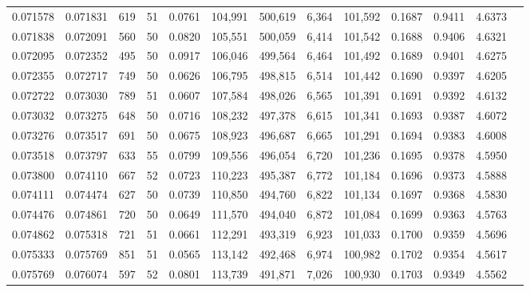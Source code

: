 \begin{tabular}{rrrrrrrrrrrrr}
0.071578 & 0.071831 &   619 &  51 &                                     0.0761 & 104,991 & 500,619 &   6,364 & 101,592 & 0.1687 & 0.9411 & 4.6373 \\
0.071838 & 0.072091 &   560 &  50 &                                     0.0820 & 105,551 & 500,059 &   6,414 & 101,542 & 0.1688 & 0.9406 & 4.6321 \\
0.072095 & 0.072352 &   495 &  50 &                                     0.0917 & 106,046 & 499,564 &   6,464 & 101,492 & 0.1689 & 0.9401 & 4.6275 \\
0.072355 & 0.072717 &   749 &  50 &                                     0.0626 & 106,795 & 498,815 &   6,514 & 101,442 & 0.1690 & 0.9397 & 4.6205 \\
0.072722 & 0.073030 &   789 &  51 &                                     0.0607 & 107,584 & 498,026 &   6,565 & 101,391 & 0.1691 & 0.9392 & 4.6132 \\
0.073032 & 0.073275 &   648 &  50 &                                     0.0716 & 108,232 & 497,378 &   6,615 & 101,341 & 0.1693 & 0.9387 & 4.6072 \\
0.073276 & 0.073517 &   691 &  50 &                                     0.0675 & 108,923 & 496,687 &   6,665 & 101,291 & 0.1694 & 0.9383 & 4.6008 \\
0.073518 & 0.073797 &   633 &  55 &                                     0.0799 & 109,556 & 496,054 &   6,720 & 101,236 & 0.1695 & 0.9378 & 4.5950 \\
0.073800 & 0.074110 &   667 &  52 &                                     0.0723 & 110,223 & 495,387 &   6,772 & 101,184 & 0.1696 & 0.9373 & 4.5888 \\
0.074111 & 0.074474 &   627 &  50 &                                     0.0739 & 110,850 & 494,760 &   6,822 & 101,134 & 0.1697 & 0.9368 & 4.5830 \\
0.074476 & 0.074861 &   720 &  50 &                                     0.0649 & 111,570 & 494,040 &   6,872 & 101,084 & 0.1699 & 0.9363 & 4.5763 \\
0.074862 & 0.075318 &   721 &  51 &                                     0.0661 & 112,291 & 493,319 &   6,923 & 101,033 & 0.1700 & 0.9359 & 4.5696 \\
0.075333 & 0.075769 &   851 &  51 &                                     0.0565 & 113,142 & 492,468 &   6,974 & 100,982 & 0.1702 & 0.9354 & 4.5617 \\
0.075769 & 0.076074 &   597 &  52 &                                     0.0801 & 113,739 & 491,871 &   7,026 & 100,930 & 0.1703 & 0.9349 & 4.5562 \\

\end{tabular}
